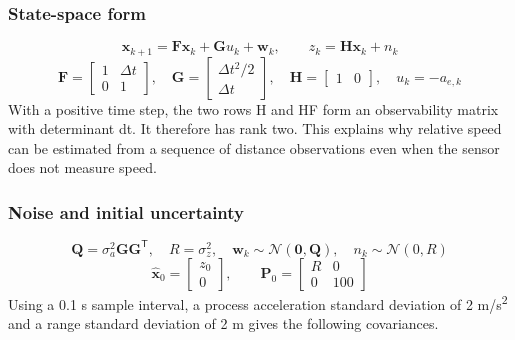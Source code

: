 \documentclass[11pt,a4paper]{article}
\begin{document}
\subsubsection{State-space form}
\begin{equation}\mathbf{x}_{k+1}=\mathbf{F}\mathbf{x}_k+\mathbf{G}u_k+\mathbf{w}_k,\qquad z_k=\mathbf{H}\mathbf{x}_k+n_k\end{equation}
\begin{equation}\mathbf{F}=\begin{bmatrix}1&\Delta t\\0&1\end{bmatrix},\quad\mathbf{G}=\begin{bmatrix}\Delta t^2/2\\\Delta t\end{bmatrix},\quad\mathbf{H}=\begin{bmatrix}1&0\end{bmatrix},\quad u_k=-a_{e,k}\end{equation}
With a positive time step, the two rows H and HF form an observability matrix with determinant dt. It therefore has rank two. This explains why relative speed can be estimated from a sequence of distance observations even when the sensor does not measure speed.\par

\subsubsection{Noise and initial uncertainty}
\begin{equation}\mathbf{Q}=\sigma_a^2\mathbf{G}\mathbf{G}^{\mathsf T},\quad R=\sigma_z^2,\quad \mathbf{w}_k\sim\mathcal{N}(\mathbf{0},\mathbf{Q}),\quad n_k\sim\mathcal{N}(0,R)\end{equation}
\begin{equation}\widehat{\mathbf{x}}_0=\begin{bmatrix}z_0\\0\end{bmatrix},\qquad\mathbf{P}_0=\begin{bmatrix}R&0\\0&100\end{bmatrix}\end{equation}
Using a 0.1 s sample interval, a process acceleration standard deviation of 2 m/s\textsuperscript{2} and a range standard deviation of 2 m gives the following covariances.\par
\end{document}
